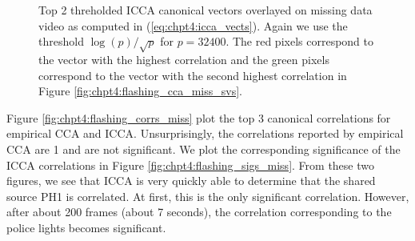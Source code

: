 \begin{figure}
  \begin{center}
    \caption{Top 2 threholded ICCA canonical vectors overlayed on missing data video as
      computed in (\ref{eq:chpt4:icca_vects}). Again we use the threshold
      $\log(p)/\sqrt{p}$ for $p=32400$. The red pixels correspond to the vector with the
      highest correlation and the green pixels correspond to the vector with the second
      highest correlation in Figure \ref{fig:chpt4:flashing_cca_miss_svs}.}
    \label{fig:chpt4:flashing_icca_miss}
  \end{center}
\end{figure}

Figure \ref{fig:chpt4:flashing_corrs_miss} plot the top 3 canonical correlations for
empirical CCA and ICCA. Unsurprisingly, the correlations reported by empirical CCA are 1
and are not significant. We plot the corresponding significance of the ICCA correlations
in Figure \ref{fig:chpt4:flashing_sigs_miss}. From these two figures, we see that ICCA is
very quickly able to determine that the shared source PH1 is correlated. At first, this is
the only significant correlation. However, after about 200 frames (about 7 seconds), the
correlation corresponding to the police lights becomes significant.

